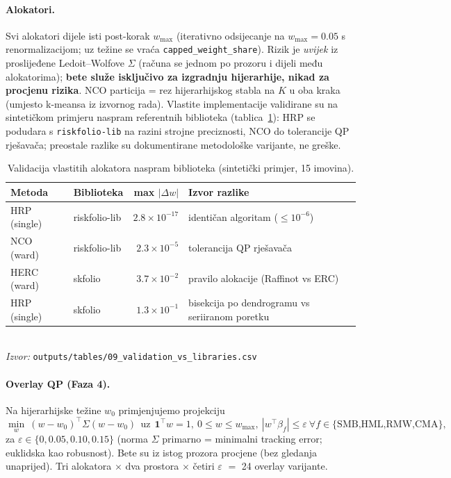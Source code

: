 \documentclass[11pt]{article}
\newcommand{\izvor}[1]{{\footnotesize\textit{Izvor:} \texttt{#1}}}
\begin{document}
\paragraph{Alokatori.} Svi alokatori dijele isti post-korak $w_{\max}$
(iterativno odsijecanje na $w_{\max}=0.05$ s renormalizacijom; uz težine se vraća
\texttt{capped\_weight\_share}). Rizik je \emph{uvijek} iz proslijeđene
Ledoit--Wolfove $\Sigma$ (računa se jednom po prozoru i dijeli među alokatorima);
\textbf{bete služe isključivo za izgradnju hijerarhije, nikad za procjenu rizika}.
NCO particija = rez hijerarhijskog stabla na $K$ u oba kraka (umjesto k-meansa iz
izvornog rada). Vlastite implementacije validirane su na sintetičkom primjeru
naspram referentnih biblioteka (tablica~\ref{tab:lib}): HRP se podudara s
\texttt{riskfolio-lib} na razini strojne preciznosti, NCO do tolerancije QP
rješavača; preostale razlike su dokumentirane metodološke varijante, ne greške.

\begin{table}[!htbp]
  \centering
  \caption{Validacija vlastitih alokatora naspram biblioteka (sintetički primjer,
  15 imovina).}
  \label{tab:lib}
  \small
  \begin{tabular}{llr l}
    \toprule
    Metoda & Biblioteka & max $|\Delta w|$ & Izvor razlike \\
    \midrule
    HRP (single) & riskfolio-lib & $2.8\!\times\!10^{-17}$ & identičan algoritam ($\le 10^{-6}$) \\
    NCO (ward)   & riskfolio-lib & $2.3\!\times\!10^{-5}$  & tolerancija QP rješavača \\
    HERC (ward)  & skfolio       & $3.7\!\times\!10^{-2}$  & pravilo alokacije (Raffinot vs ERC) \\
    HRP (single) & skfolio       & $1.3\!\times\!10^{-1}$  & bisekcija po dendrogramu vs seriiranom poretku \\
    \bottomrule
  \end{tabular}\\[0.3em]
  \izvor{outputs/tables/09\_validation\_vs\_libraries.csv}
\end{table}

\paragraph{Overlay QP (Faza 4).} Na hijerarhijske težine $w_0$ primjenjujemo
projekciju
\[
  \min_w\ (w-w_0)^{\!\top}\Sigma(w-w_0)\ \ \text{uz}\ \
  \mathbf{1}^{\!\top}w=1,\ 0\le w\le w_{\max},\
  |w^{\!\top}\beta_f|\le\varepsilon\ \forall f\in\{\text{SMB,HML,RMW,CMA}\},
\]
za $\varepsilon\in\{0,0.05,0.10,0.15\}$ (norma $\Sigma$ primarno = minimalni
tracking error; euklidska kao robusnost). Bete su iz istog prozora procjene (bez
gledanja unaprijed). Tri alokatora $\times$ dva prostora $\times$ četiri
$\varepsilon$ $=$ 24 overlay varijante.
\end{document}
